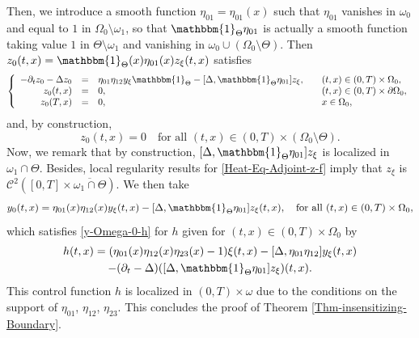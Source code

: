 \documentclass[10pt,a4paper]{amsart}
\theoremstyle{definition}
\begin{document}
Then, we introduce a smooth function $\eta_{01} = \eta_{01}(x)$ such that $\eta_{01}$ vanishes in $ \omega_0$ and equal to $1$ in $\Omega_0 \setminus \omega_1$, so that $\mathbbm{1}_\Theta \eta_{01}$ is actually a smooth function taking value $1$ in $\Theta \setminus \omega_1$ and vanishing in $\omega_0 \cup (\Omega_0 \setminus \Theta)$. Then $ z_0(t,x)= \mathbbm{1}_\Theta(x) \eta_{01}(x) z_\xi(t,x)$ satisfies
\begin{equation*}
\left\{
\begin{array}{rcll}
- \partial_t z_0 - \Delta z_0 &=& \eta_{01} \eta_{12} y_\xi \mathbbm{1}_{\Theta}
- [\Delta, \mathbbm{1}_\Theta \eta_{01}] z_\xi
, \quad & (t,x) \in (0,T) \times \Omega_0,
\\
z_0(t, x) &=& 0, \quad & (t,x) \in (0,T) \times \partial \Omega_0,
\\
z_0(T,x) &=& 0, \quad & x \in \Omega_0,
\end{array}
\right.
\end{equation*}
and, by construction,
\[
z_0(t,x) = 0 \quad\text{for all } (t,x) \in (0,T) \times (\Omega_0 \setminus \Theta).
\]
Now, we remark that by construction, $[\Delta, \mathbbm{1}_\Theta \eta_{01}] z_\xi$ is localized in $\omega_1 \cap \Theta$. Besides, local regularity results for \eqref{Heat-Eq-Adjoint-z-f} imply that $z_\xi$ is $\mathscr{C}^2([0,T] \times \overline{\omega_1 \cap \Theta})$. We then take
\[
y_0(t,x) = \eta_{01}(x) \eta_{12}(x) y_\xi(t,x) - [\Delta, \mathbbm{1}_\Theta \eta_{01} ] z_\xi(t,x), \quad \text{for all } (t,x) \in (0,T) \times \Omega_0,
\]
which satisfies \eqref{y-Omega-0-h} for $h$ given for $(t,x) \in (0,T) \times \Omega_0$ by
\begin{multline*}
h(t,x) = (\eta_{01}(x) \eta_{12}(x) \eta_{23}(x)-1) \xi(t,x) - [\Delta, \eta_{01} \eta_{12}] y_\xi(t,x)\\
- (\partial_t - \Delta) ([\Delta, \mathbbm{1}_\Theta \eta_{01}] z_\xi)(t,x).
\end{multline*}
This control function $h$ is localized in $(0,T) \times \omega$ due to the conditions on the support of $\eta_{01}$, $\eta_{12}$, $\eta_{23}$. This concludes the proof of Theorem \ref{Thm-insensitizing-Boundary}.
\end{document}
